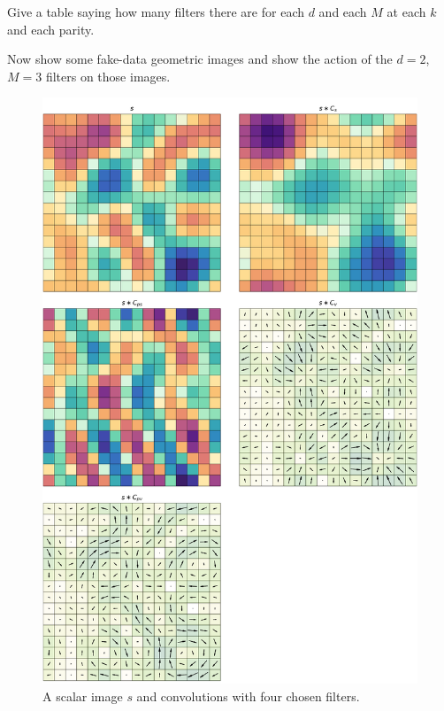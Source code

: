 \documentclass{article}
\theoremstyle{plain}
\begin{document}
Give a table saying how many filters there are for each $d$ and each $M$ at each $k$ and each parity.

Now show some fake-data geometric images and show the action of the $d=2$, $M=3$ filters on those images.

\begin{figure}
  \begin{mdframed}
  \color{captiongray}
  \begin{center}
    \includegraphics[width=\textwidth]{notebooks/monomials_1.png}
  \end{center}
    \caption{A scalar image $s$ and convolutions with four chosen filters.}
  \end{mdframed}
\end{figure}
\end{document}

